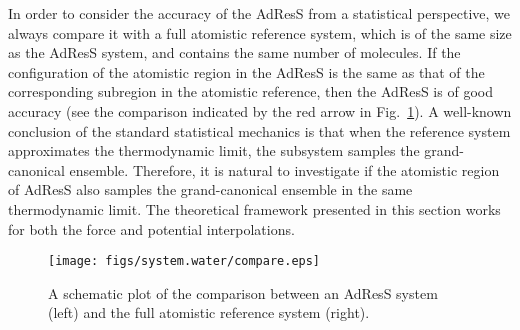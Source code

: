 \documentclass[epjST]{svjour}
\newcommand{\recheck}[1]{{\color{red} #1}}
\begin{document}
In order to consider the accuracy of the AdResS from a statistical perspective, we always compare it with a full
atomistic reference system, which is of the same size as the AdResS system,
and contains the same number of molecules.
If the configuration of the atomistic region in the AdResS 
is the same as that of the corresponding subregion in the atomistic reference, then
the AdResS  is of good accuracy (see the comparison indicated by the red arrow in Fig.~\ref{fig:compare}).
A well-known conclusion of the standard statistical mechanics is that
when the reference system approximates the thermodynamic limit, the subsystem
\recheck{samples} the grand-canonical ensemble. Therefore, it is natural to investigate
if the atomistic region of AdResS also \recheck{samples} the grand-canonical ensemble
in the same thermodynamic limit. The theoretical framework presented in this section works for
both the force and potential interpolations.

\begin{figure}
  \centering
  \texttt{[image: figs/system.water/compare.eps]}
  \caption{A schematic plot of the comparison between an AdResS system (left) and the full atomistic reference system (right).}
  \label{fig:compare}
\end{figure}
\end{document}
